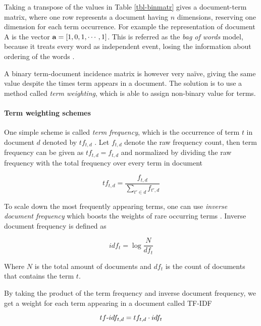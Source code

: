\noindent
Taking a transpose of the values in Table \ref{tbl-binmatr} gives a document-term matrix, where one row represents a document having $n$ dimensions, reserving one dimension for each term occurrence. For example the representation of document A is the vector $\mathbf{a} = [1, 0, 1, \cdots, 1]$. This is referred as the \emph{bag of words} model, because it treats every word as independent event, losing the information about ordering of the words \cite{Manning:2008:IIR:1394399}. 


A binary term-document incidence matrix is however very naïve, giving the same value despite the times term appears in a document. The solution is to use a  method called \emph{term weighting}, which is able to assign non-binary value for terms. 

\paragraph{Term weighting schemes}

One simple scheme is called \emph{term frequency}, which is the occurrence of term $t$ in document $d$ denoted by $tf_{t, d}$ \cite{Manning:2008:IIR:1394399}. Let $f_{t, d}$ denote the raw frequency count, then term frequency can be given as $tf_{t, d} = f_{t, d}$ and normalized by dividing the raw frequency with the total frequency over every term in document

\begin{equation} \label{eq-tf}
    tf_{t, d} = \dfrac{f_{t, d}}{\sum \limits_{t' \in d} f_{t', d}}
\end{equation}

To scale down the most frequently appearing terms, one can use \emph{inverse document frequency} which boosts the weights of rare occurring terms \cite{Manning:2008:IIR:1394399}. Inverse document frequency is defined as

\begin{equation}
    idf_t = \log \dfrac{N}{df_t}
\end{equation}

\noindent
Where $N$ is the total amount of documents and $df_{t}$ is the count of documents that contains the term $t$.

By taking the product of the term frequency and inverse document frequency, we get a weight for each term appearing in a document called TF-IDF

\begin{equation}
    tf{\text -}idf_{t, d} = tf_{t, d} \cdot idf_{t}
\end{equation}

